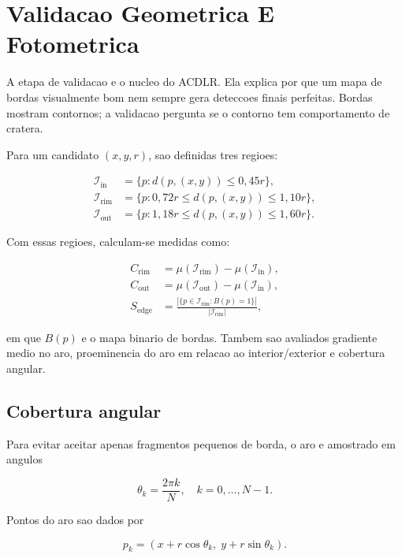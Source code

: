 \documentclass[12pt,a4paper]{article}
\begin{document}
\section{Validacao Geometrica E Fotometrica}

A etapa de validacao e o nucleo do ACDLR. Ela explica por que um mapa de bordas visualmente bom nem sempre gera deteccoes finais perfeitas. Bordas mostram contornos; a validacao pergunta se o contorno tem comportamento de cratera.

Para um candidato $(x,y,r)$, sao definidas tres regioes:

\begin{align}
\mathcal{I}_{\text{in}} &= \{p : d(p,(x,y)) \leq 0{,}45r\},\\
\mathcal{I}_{\text{rim}} &= \{p : 0{,}72r \leq d(p,(x,y)) \leq 1{,}10r\},\\
\mathcal{I}_{\text{out}} &= \{p : 1{,}18r \leq d(p,(x,y)) \leq 1{,}60r\}.
\end{align}

Com essas regioes, calculam-se medidas como:

\begin{align}
C_{\text{rim}} &= \mu(\mathcal{I}_{\text{rim}}) - \mu(\mathcal{I}_{\text{in}}),\\
C_{\text{out}} &= \mu(\mathcal{I}_{\text{out}}) - \mu(\mathcal{I}_{\text{in}}),\\
S_{\text{edge}} &= \frac{|\{p \in \mathcal{I}_{\text{rim}} : B(p)=1\}|}{|\mathcal{I}_{\text{rim}}|},
\end{align}

em que $B(p)$ e o mapa binario de bordas. Tambem sao avaliados gradiente medio no aro, proeminencia do aro em relacao ao interior/exterior e cobertura angular.

\subsection{Cobertura angular}

Para evitar aceitar apenas fragmentos pequenos de borda, o aro e amostrado em angulos

\begin{equation}
\theta_k = \frac{2\pi k}{N}, \quad k=0,\dots,N-1.
\end{equation}

Pontos do aro sao dados por

\begin{equation}
p_k = (x + r\cos\theta_k,\; y + r\sin\theta_k).
\end{equation}
\end{document}
